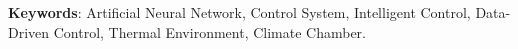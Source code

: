 \lipsum[148-149]

\vspace{0.5cm}
\hspace{-1.2cm}
\textbf{Keywords}: Artificial Neural Network, Control System, Intelligent Control, Data-Driven Control, Thermal Environment, Climate Chamber.

